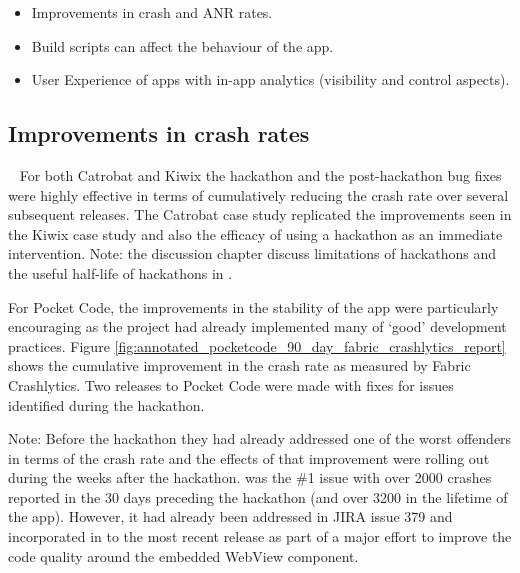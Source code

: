 \begin{itemize}
    \itemsep0em
    \item Improvements in crash and ANR rates.
    \item Build scripts can affect the behaviour of the app.
    \item User Experience of apps with in-app analytics (visibility and control aspects).
\end{itemize}

\subsection{Improvements in crash rates}~\label{aata-improvements-in-crash-rates-topic}
For both Catrobat and Kiwix the hackathon and the post-hackathon bug fixes were highly effective in terms of cumulatively reducing the crash rate over several subsequent releases. %
The Catrobat case study replicated the improvements seen in the Kiwix case study and also the efficacy of using a hackathon as an immediate intervention. Note: the discussion chapter discuss limitations of hackathons and the useful half-life of hackathons in . 


For Pocket Code, the improvements in the stability of the app were particularly encouraging as the project had already implemented many of `good' development practices. Figure \ref{fig:annotated_pocketcode_90_day_fabric_crashlytics_report} shows the cumulative improvement in the crash rate as measured by Fabric Crashlytics. Two releases to Pocket Code were made with fixes for issues identified during the hackathon.

Note: Before the hackathon they had already addressed one of the worst offenders in terms of the crash rate and the effects of that improvement were rolling out during the weeks after the hackathon.
 was the \#1 issue with over 2000 crashes reported in the 30 days preceding the hackathon (and over 3200 in the lifetime of the app). However, it had already been addressed in JIRA issue 379 and incorporated in to the most recent release  as part of a major effort to improve the code quality around the embedded WebView component.

